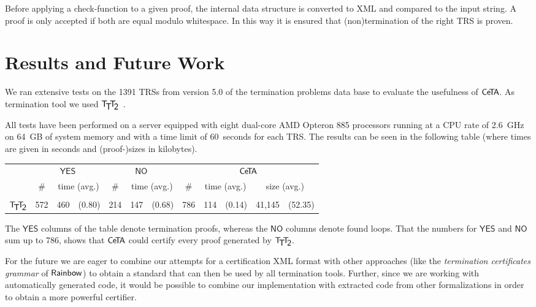 \documentclass[a4paper,final]{easychair}
\theoremstyle{definition}
\newcommand\formatID[1]{\ensuremath{{\sf#1}}}
\newcommand\CeTA{\formatID{C\kern-0.10exe\kern-0.40exT\kern-0.40exA}}
\newcommand\Rainbow{\formatID{Rainbow}}
\newcommand\TTTT{\formatID{T\kern-0.2em\raisebox{-0.3em}{$\mathsf{T}$}\kern-0.2emT\kern-0.2em\raisebox{-0.3em}{$\mathsf{2}$}}}
\newcommand\YES{\ensuremath{\mathsf{YES}}}
\newcommand\NO{\ensuremath{\mathsf{NO}}}
\begin{document}
Before applying a check-function to a given proof, the internal data structure
is converted to XML and compared to the input string. A proof is only accepted
if both are equal modulo whitespace. In this way it is ensured that
(non)termination of the right TRS is proven.

\section{Results and Future Work}
\label{sec:experiments}
We ran extensive tests on the 1391 TRSs from version 5.0 of the termination
problems data base to evaluate the usefulness of \CeTA. As termination tool we
used \TTTT{}~\cite{TTT2}.

All tests have been performed on a server equipped with
eight dual-core AMD Opteron\textregistered{} 885 processors running
at a CPU rate of 2.6~GHz on 64~GB of system memory and with a time limit of
60~seconds for each TRS. 
The results can be seen in the following table
(where times are given in seconds and (proof-)sizes in kilobytes). 
\begin{center}
\begin{tabular}{l|rr@{~}l|rr@{~}l||rr@{~}lr@{~}l}
&\multicolumn{3}{c|}{\YES}
&\multicolumn{3}{c||}{\NO}
&\multicolumn{5}{c}{\CeTA{}}\\
&\multicolumn{1}{c}{\#}
&\multicolumn{2}{c|}{time (avg.)}
&\multicolumn{1}{c}{\#}
&\multicolumn{2}{c||}{time (avg.)}
&\multicolumn{1}{c}{\#}
&\multicolumn{2}{c}{time (avg.)}
&\multicolumn{2}{c}{size (avg.)}
\\\hline
& & & & & & \\[-2ex]
\TTTT{} & 572 & 460 & (0.80) & 214 & 147 & (0.68)
  & 786 & 114 & (0.14) & 41,145 & (52.35)
\end{tabular}
\end{center}
The \YES{} columns of the table denote termination proofs, whereas
the \NO{} columns denote found loops. That the numbers for
\YES{} and \NO{} sum up to 786, shows that \CeTA{} could certify every
proof generated by \TTTT{}.

For the future we are eager to combine our attempts for a certification XML
format with other approaches (like the \emph{termination certificates grammar} of
\Rainbow) to obtain a standard that can then be used by all termination tools.
Further, since we are working with automatically generated code, it would be
possible to combine our implementation with extracted code from other
formalizations in order to obtain a more powerful certifier.



\end{document}
